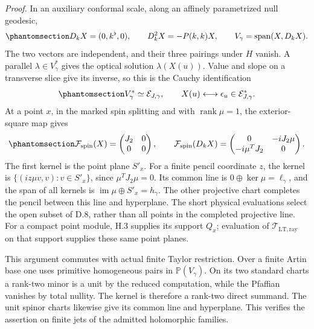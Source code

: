 \documentclass[
  english,
  11pt,
  reqno]{amsart}
\begin{document}
\emph{Proof.} In an auxiliary conformal scale, along an affinely
parametrized null geodesic,
\begin{equation}\protect\phantomsection\label{eq:gg-same-optical-plane}{
 D_kX=(0,k^\flat,0),\qquad
 D_k^2X=-P(k,k)X,\qquad
 V_\gamma=\operatorname{span}(X,D_kX).
}\end{equation} The two vectors are independent, and their three
pairings under \(H\) vanish. A parallel \(\lambda\in V_\gamma^*\) gives
the optical solution \(\lambda(X(u))\). Value and slope on a transverse
slice give its inverse, so this is the Cauchy identification
\begin{equation}\protect\phantomsection\label{eq:gg-same-optical-cauchy-comparison}{
 V_\gamma^*\simeq\mathcal E_{J,\gamma},\qquad
 X(u)\longleftrightarrow\epsilon_u\in\mathcal E_{J,\gamma}^*.
}\end{equation} At a point \(x\), in the marked spin splitting and with
\(\operatorname{rank}\mu=1\), the exterior-square map gives
\begin{equation}\protect\phantomsection\label{eq:gg-same-point-pencil-matrices}{
 \mathcal F_{\mathrm{spin}}(X)=
 \begin{pmatrix}J_2&0\\0&0\end{pmatrix},\qquad
 \mathcal F_{\mathrm{spin}}(D_kX)=
 \begin{pmatrix}0&-iJ_2\mu\\-i\mu^TJ_2&0\end{pmatrix}.
}\end{equation} The first kernel is the point plane \(S'_x\). For a
finite pencil coordinate \(z\), the kernel is
\(\{(iz\mu v,v):v\in S'_x\}\), since \(\mu^TJ_2\mu=0\). Its common line
is \(0\oplus\ker\mu=\ell_\gamma\), and the span of all kernels is
\(\operatorname{im}\mu\oplus S'_x=h_\gamma\). The other projective chart
completes the pencil between this line and hyperplane. The short
physical evaluations select the open subset of D.8, rather than all
points in the completed projective line. For a compact point module, H.3
supplies its support \(Q_x\); evaluation of
\(\mathcal T_{\mathrm{LT,ray}}\) on that support supplies these same
point planes.

This argument commutes with actual finite Taylor restriction. Over a
finite Artin base one uses primitive homogeneous pairs in
\(\mathbb P(V_\gamma)\). On its two standard charts a rank-two minor is
a unit by the reduced computation, while the Pfaffian vanishes by total
nullity. The kernel is therefore a rank-two direct summand. The unit
spinor charts likewise give its common line and hyperplane. This
verifies the assertion on finite jets of the admitted holomorphic
families.
\end{document}
